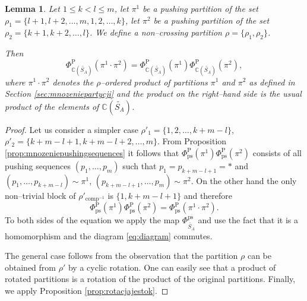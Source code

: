 \documentclass[12pt,dvips]{amsart}
\numberwithin{equation}{section} \numberwithin{figure}{section}
\theoremstyle{plain}
\newtheorem{lemma}{Lemma}[section]
\theoremstyle{definition}
\theoremstyle{remark}
\newcommand{\C}{{\mathbb{C}}}
\newcommand{\Z}{{\mathbb{Z}}}
\newcommand{\Sn}[1]{{{S}}_{#1}}
\newcommand{\xtra}{\ast}
\newcommand{\fpsas}{\Phi^{\ps}_{\adm}}
\newcommand{\fass}{\Phi^{\adm}_{\PartPerm{A}}}
\newcommand{\fpss}{\Phi^{\ps}_{\PartPerm{A}}}
\newcommand{\fpps}{\Phi^{\pp}_{\C(\PartPerm{A})}}
\newcommand{\fppas}{\Phi^{\pp}_{\adm}}
\newcommand{\fppps}{\Phi^{\pp}_{\ps}}
\newcommand{\PartPerm}[1]{\widetilde{\Sn{#1}}}
\DeclareMathOperator{\comp}{comp}
\DeclareMathOperator{\adm}{as}
\DeclareMathOperator{\ps}{ps}
\DeclareMathOperator{\pp}{P}
\begin{document}

\begin{lemma}
\label{lem:mnozeniedwoch} Let $1\leq k< l\leq m$, let $\pi^1$ be a
pushing partition of the set
$\rho_1=\{l+1,l+2,\dots,m,1,2,\dots,k\}$, let $\pi^2$ be a pushing
partition of the set $\rho_2=\{k+1,k+2,\dots,l\}$. We define a
non--crossing partition $\rho=\{\rho_1,\rho_2\}$.

Then $$\fpps(\pi^1\cdot \pi^2)=\fpps(\pi^1) \fpps(\pi^2),$$ where
$\pi^1 \cdot \pi^2$ denotes the $\rho$--ordered product of
partitions $\pi^1$ and $\pi^2$ as defined in Section
\ref{sec:mnozeniepartycji} and the product on the right--hand side
is the usual product of the elements of $\C(\PartPerm{A})$.
\end{lemma}
\begin{proof}
Let us consider a simpler case $\rho'_1=\{1,2,\dots,k+m-l\}$,
$\rho'_2=\{k+m-l+1,k+m-l+2,\dots,m\}$. From Proposition
\ref{prop:mnozeniepushingsequences} it follows that $\fppps(\pi^1)
\fppps(\pi^2)$ consists of all pushing sequences $(p_1,\dots,p_m)$
such that $p_1=p_{k+m-l+1}=\xtra$ and $(p_1,\dots,p_{k+m-l})\sim
\pi^1$, $(p_{k+m-l+1},\dots,p_m)\sim \pi^2$. On the other hand
the only non--trivial block of $\rho'_{\comp^{-1}}$ is
$\{1,k+m-l+1\}$ and therefore
%
%
$$\fppps(\pi^1) \fppps(\pi^2) = \fppps( \pi^1
\cdot \pi^2).$$ To both sides of the equation we apply the map
$\fpss$ and use the fact that it is a homomorphism and the diagram
\eqref{eq:diagram} commutes.

The general case follows from the observation that the partition
$\rho$ can be obtained from $\rho'$ by a cyclic rotation. One can
easily see that a product of rotated partitions is a rotation of the
product of the original partitions. Finally, we apply Proposition
\ref{prop:rotacjajestok}.
\end{proof}
\end{document}
